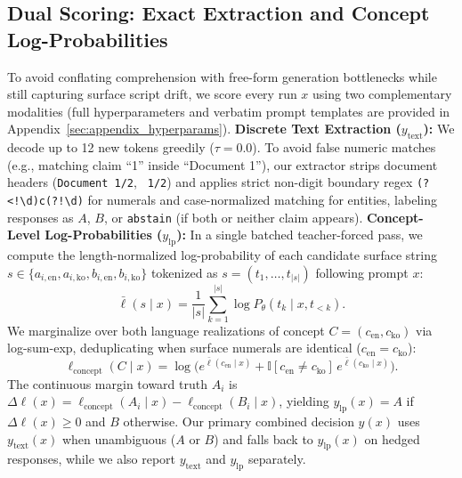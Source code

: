 \subsection{Dual Scoring: Exact Extraction and Concept Log-Probabilities}
\label{subsec:scoring}

To avoid conflating comprehension with free-form generation bottlenecks \citep{qi2025consistency} while still capturing surface script drift, we score every run $x$ using two complementary modalities (full hyperparameters and verbatim prompt templates are provided in Appendix~\ref{sec:appendix_hyperparams}). \textbf{Discrete Text Extraction ($y_{\text{text}}$):} We decode up to 12 new tokens greedily ($\tau{=}0.0$). To avoid false numeric matches (e.g., matching claim ``1'' inside ``Document 1''), our extractor strips document headers (\texttt{Document 1/2}, \texttt{ 1/2}) and applies strict non-digit boundary regex \texttt{(?<!\textbackslash d)c(?!\textbackslash d)} for numerals and case-normalized matching for entities, labeling responses as $A$, $B$, or \texttt{abstain} (if both or neither claim appears). \textbf{Concept-Level Log-Probabilities ($y_{\text{lp}}$):} In a single batched teacher-forced pass, we compute the length-normalized log-probability of each candidate surface string $s \in \{a_{i,\text{en}}, a_{i,\text{ko}}, b_{i,\text{en}}, b_{i,\text{ko}}\}$ tokenized as $s = (t_1, \dots, t_{|s|})$ following prompt $x$:
\begin{equation}
    \bar{\ell}(s \mid x) = \frac{1}{|s|} \sum_{k=1}^{|s|} \log P_\theta(t_k \mid x, t_{<k}).
    \label{eq:len_norm_lp}
\end{equation}
We marginalize over both language realizations of concept $C = (c_{\text{en}}, c_{\text{ko}})$ via log-sum-exp, deduplicating when surface numerals are identical ($c_{\text{en}}{=}c_{\text{ko}}$):
{\footnotesize
\begin{equation}
\ell_{\text{concept}}(C \mid x) = \log\bigl(e^{\bar{\ell}(c_{\text{en}} \mid x)} + \mathbb{I}[c_{\text{en}} \neq c_{\text{ko}}]\,e^{\bar{\ell}(c_{\text{ko}} \mid x)}\bigr).
\label{eq:concept_lp}
\end{equation}%
}
The continuous margin toward truth $A_i$ is $\Delta\ell(x) = \ell_{\text{concept}}(A_i \mid x) - \ell_{\text{concept}}(B_i \mid x)$, yielding $y_{\text{lp}}(x) = A$ if $\Delta\ell(x) \ge 0$ and $B$ otherwise. Our primary combined decision $y(x)$ uses $y_{\text{text}}(x)$ when unambiguous ($A$ or $B$) and falls back to $y_{\text{lp}}(x)$ on hedged responses, while we also report $y_{\text{text}}$ and $y_{\text{lp}}$ separately.

